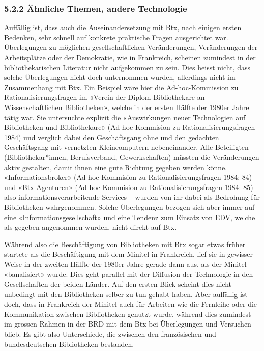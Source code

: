 \documentclass[a4paper,
fontsize=11pt,
oneside,
numbers=noperiodatend,
parskip=half-,
bibliography=totoc,
final
]{scrartcl}
\begin{document}
\hypertarget{uxe4hnliche-themen-andere-technologie}{%
\subsubsection{5.2.2 Ähnliche Themen, andere
Technologie}\label{uxe4hnliche-themen-andere-technologie}}

Auffällig ist, dass auch die Auseinandersetzung mit Btx, nach einigen
ersten Bedenken, sehr schnell auf konkrete praktische Fragen
ausgerichtet war. Überlegungen zu möglichen gesellschaftlichen
Veränderungen, Veränderungen der Arbeitsplätze oder der Demokratie, wie
in Frankreich, scheinen zumindest in der bibliothekarischen Literatur
nicht aufgekommen zu sein. Dies heisst nicht, dass solche Überlegungen
nicht doch unternommen wurden, allerdings nicht im Zusammenhang mit Btx.
Ein Beispiel wäre hier die Ad-hoc-Kommission zu Rationalisierungsfragen
im «Verein der Diplom-Bibliothekare an Wissenschaftlichen Bibliotheken»,
welche in der ersten Hälfte der 1980er Jahre tätig war. Sie untersuchte
explizit die «Auswirkungen neuer Technologien auf Bibliotheken und
Bibliothekare» (Ad-hoc-Kommision zu Rationalisierungsfragen 1984) und
verglich dabei den Geschäftsgang ohne und den gedachten Geschäftsgang
mit vernetzten Kleincomputern nebeneinander. Alle Beteiligten
(Bibliothekar*innen, Berufsverband, Gewerkschaften) müssten die
Veränderungen aktiv gestalten, damit ihnen eine gute Richtung gegeben
werden könne. «Informationsbroker» (Ad-hoc-Kommision zu
Rationalisierungsfragen 1984: 84) und «Btx-Agenturen» (Ad-hoc-Kommision
zu Rationalisierungsfragen 1984: 85) -- also informationsverarbeitende
Services -- wurden von ihr dabei als Bedrohung für Bibliotheken
wahrgenommen. Solche Überlegungen bezogen sich aber immer auf eine
«Informationsgesellschaft» und eine Tendenz zum Einsatz von EDV, welche
als gegeben angenommen wurden, nicht direkt auf Btx.

Während also die Beschäftigung von Bibliotheken mit Btx sogar etwas
früher startete als die Beschäftigung mit dem Minitel in Frankreich,
lief sie in gewisser Weise in der zweiten Hälfte der 1980er Jahre gerade
dann aus, als der Minitel «banalisiert» wurde. Dies geht parallel mit
der Diffusion der Technologie in den Gesellschaften der beiden Länder.
Auf den ersten Blick scheint dies nicht unbedingt mit den Bibliotheken
selber zu tun gehabt haben. Aber auffällig ist doch, dass in Frankreich
der Minitel auch für Arbeiten wie die Fernleihe oder die Kommunikation
zwischen Bibliotheken genutzt wurde, während dies zumindest im grossen
Rahmen in der BRD mit dem Btx bei Überlegungen und Versuchen blieb. Es
gibt also Unterschiede, die zwischen den französischen und
bundesdeutschen Bibliotheken bestanden.
\end{document}
